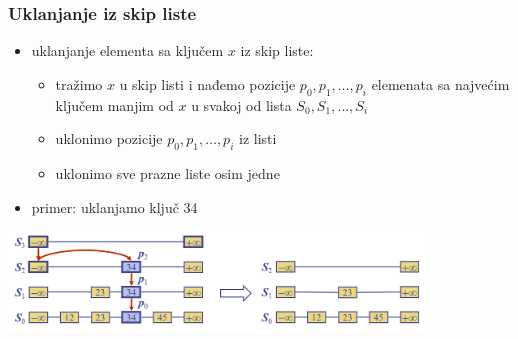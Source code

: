 \documentclass[compress]{beamer}
\begin{document}
\begin{frame}[fragile]
  \frametitle{Uklanjanje iz skip liste}
  \begin{itemize}
    \item uklanjanje elementa sa ključem $x$ iz skip liste:
    \begin{itemize}
      \item tražimo $x$ u skip listi i nađemo pozicije $p_0, p_1, \ldots, p_i$ elemenata sa najvećim ključem manjim od $x$ u svakoj od lista $S_0, S_1, \ldots, S_i$
      \item uklonimo pozicije $p_0, p_1, \ldots, p_i$ iz listi
      \item uklonimo sve prazne liste osim jedne
    \end{itemize}
    \item primer: uklanjamo ključ 34 
  \end{itemize}
  \begin{center}
    \includegraphics[width=11cm]{asp-10-pic14.png}
  \end{center}
\end{frame}
\end{document}

